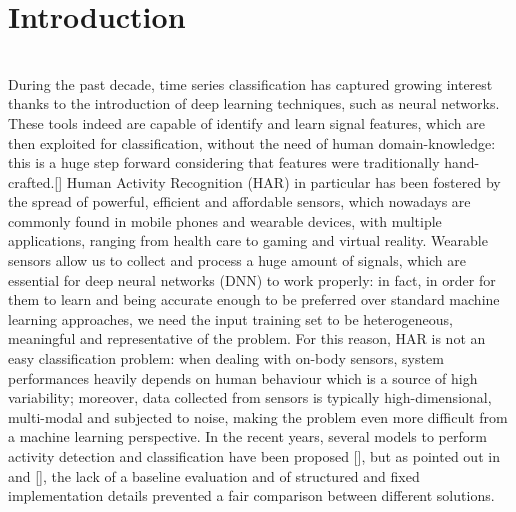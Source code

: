 
\section{Introduction}
\label{sec:introduction}

\\

During the past decade, time series classification has captured growing interest thanks to the introduction of deep learning techniques, such as neural networks. These tools indeed are capable of identify and learn signal features, which are then exploited for classification, without the need of human domain-knowledge: this is a huge step forward considering that features were traditionally hand-crafted.[]
Human Activity Recognition (HAR) in particular has been fostered by the spread of powerful, efficient and affordable sensors, which nowadays are commonly found in mobile phones and wearable devices, with multiple applications, ranging from health care to gaming and virtual reality. \cite{HAR-2013}
Wearable sensors allow us to collect and process a huge amount of signals, which are essential for deep neural networks (DNN) to work properly: in fact, in order for them to learn and being accurate enough to be preferred over standard machine learning approaches, we need the input training set to be heterogeneous, meaningful and representative of the problem.
For this reason, HAR is not an easy classification problem: when dealing with on-body sensors, system performances heavily depends on human behaviour which is a source of high variability; moreover, data collected from sensors is typically high-dimensional, multi-modal and subjected to noise, making the problem even more difficult from a machine learning perspective.
In the recent years, several models to perform activity detection and classification have been proposed [], but as pointed out in \cite{Chavarriaga2013} and [], the lack of a baseline evaluation and of structured and fixed implementation details prevented a fair comparison between different solutions.

